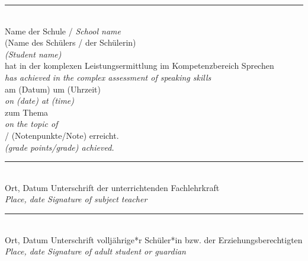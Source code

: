 \documentclass[11pt,a4paper]{article}
\begin{document}
\begin{tcolorbox}[colback=white, colframe=spanischrot, boxrule=1.5pt]
\begin{center}
\rule{\textwidth}{0.5pt}\\[0.3cm]
{\small Name der Schule / \textit{School name}}\\[0.5cm]

\underline{\hspace{8cm}} {\small (Name des Schülers / der Schülerin)}\\[0.3cm]
{\color{englishgray}\textit{(Student name)}}\\[0.5cm]

hat in der komplexen Leistungsermittlung im Kompetenzbereich Sprechen\\
{\color{englishgray}\textit{has achieved in the complex assessment of speaking skills}}\\[0.3cm]

am \underline{\hspace{3cm}} (Datum) um \underline{\hspace{2cm}} (Uhrzeit)\\
{\color{englishgray}\textit{on (date) at (time)}}\\[0.3cm]

zum Thema \underline{\hspace{6cm}}\\
{\color{englishgray}\textit{on the topic of}}\\[0.3cm]

\underline{\hspace{2cm}} / \underline{\hspace{2cm}} (Notenpunkte/Note) erreicht.\\
{\color{englishgray}\textit{(grade points/grade) achieved.}}\\[0.5cm]

\rule{\textwidth}{0.5pt}\\[0.3cm]
{\small Ort, Datum \hfill Unterschrift der unterrichtenden Fachlehrkraft}\\
{\small\color{englishgray}\textit{Place, date \hfill Signature of subject teacher}}\\[0.5cm]

\rule{\textwidth}{0.5pt}\\[0.3cm]
{\small Ort, Datum \hfill Unterschrift volljährige*r Schüler*in bzw. der Erziehungsberechtigten}\\
{\small\color{englishgray}\textit{Place, date \hfill Signature of adult student or guardian}}
\end{center}
\end{tcolorbox}
\end{document}

